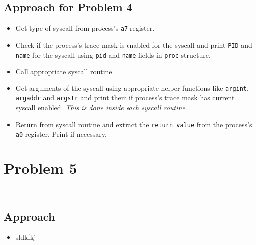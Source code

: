 \documentclass[11pt,a4paper,english]{paper}
\newenvironment{colorboxed}[4][gray]{
\begin{tcolorbox}[colback=#1!3!white,colframe=#1(ryb)!50!black,title=\textbf{#2: #3},#4]
}{
\end{tcolorbox}
}
\begin{document}
\subsection*{Approach for Problem 4}
\begin{itemize}[noitemsep, nolistsep]
    \item Get type of syscall from process's \texttt{a7} register.
    \item Check if the process's trace mask is enabled for the syscall and print \texttt{PID} and \texttt{name} for the syscall using \texttt{pid} and \texttt{name} fields in \texttt{proc} structure.
    \item Call appropriate syscall routine.
    \item Get arguments of the syscall using appropriate helper functions like \texttt{argint}, \texttt{argaddr} and \texttt{argstr} and print them if process's trace mask has current syscall enabled. \textit{This is done inside each syscall routine}.
    \item Return from syscall routine and extract the \texttt{return value} from the process's \texttt{a0} register. Print if necessary.
\end{itemize}
\section*{Problem 5}
\begin{colorboxed}{Code}{\texttt{kernel/sysproc.c::\textit{sys\_get\_process\_info()}}}{unbreakable}
    \inputminted[baselinestretch=0.85,firstline=157,breaklines]{c}{kernel/sysproc.c}
\end{colorboxed}
\begin{colorboxed}{Code}{\texttt{user/test\_program\_5.c::\textit{main()}}}{unbreakable}
    \inputminted[baselinestretch=0.85,firstline=1,lastline=19,breaklines]{c}{user/test_program_5.c}
\end{colorboxed}
\subsection*{Approach}
\begin{itemize}[noitemsep, nolistsep]
    \item sldkfkj
\end{itemize}



%
%
\end{document}
